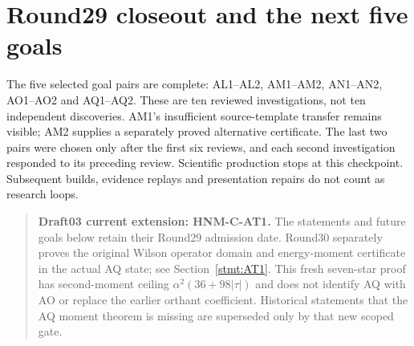 \section{Round29 closeout and the next five goals}
\label{sec:round29-closeout}
The five selected goal pairs are complete: AL1--AL2, AM1--AM2, AN1--AN2, AO1--AO2 and AQ1--AQ2. These are ten reviewed investigations, not ten independent discoveries. AM1's insufficient source-template transfer remains visible; AM2 supplies a separately proved alternative certificate. The last two pairs were chosen only after the first six reviews, and each second investigation responded to its preceding review. Scientific production stops at this checkpoint. Subsequent builds, evidence replays and presentation repairs do not count as research loops.

\begin{quote}\small\textbf{Draft03 current extension: HNM-C-AT1.} The statements and future goals below retain their Round29 admission date. Round30 separately proves the original Wilson operator domain and energy-moment certificate in the actual AQ state; see Section~\ref{stmt:AT1}. This fresh seven-star proof has second-moment ceiling $\alpha^2(36+98|\tau|)$ and does not identify AQ with AO or replace the earlier orthant coefficient. Historical statements that the AQ moment theorem is missing are superseded only by that new scoped gate.\end{quote}

